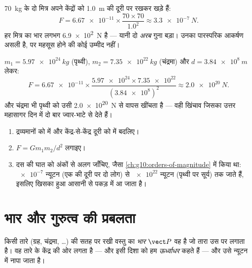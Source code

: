 \begin{example}[दो मित्र]\label{ex:g10:universal-gravitation:friends}
\qty{70}{kg} के दो मित्र अपने केंद्रों को \qty{1.0}{m} की दूरी पर रखकर खड़े हैं:
\[
F = \num{6.67e-11} \times \frac{70 \times 70}{1.0^2}
\approx \qty{3.3e-7}{N}.
\]
हर मित्र का भार लगभग \qty{6.9e2}{N} है --- यानी दो \emph{अरब} गुना
बड़ा। उनका पारस्परिक आकर्षण असली है, पर महसूस होने की कोई उम्मीद नहीं।
\end{example}

\begin{example}[पृथ्वी चंद्रमा को थामे है]\label{ex:g10:universal-gravitation:earthmoon}
$m_1 = \qty{5.97e24}{kg}$ (पृथ्वी), $m_2 = \qty{7.35e22}{kg}$ (चंद्रमा) और $d = \qty{3.84e8}{m}$ लेकर:
\[
F = \num{6.67e-11} \times
\frac{\num{5.97e24} \times \num{7.35e22}}{(\num{3.84e8})^2}
\approx \qty{2.0e20}{N}.
\]
और चंद्रमा भी पृथ्वी को उसी \qty{2.0e20}{N} से वापस खींचता है --- वही खिंचाव
जिसका उत्तर महासागर दिन में दो बार ज्वार-भाटे से देते हैं।
\end{example}

\begin{method}[कोई गुरुत्वाकर्षण बल निकालना]\label{met:g10:universal-gravitation:compute}
\begin{enumerate}
  \item द्रव्यमानों को  में और केंद्र-से-केंद्र दूरी को
         में बदलिए।
  \item $F = G m_1 m_2 / d^2$ लगाइए।
  \item दस की घात को अंकों से अलग जाँचिए, जैसा \cref{ch:g10:orders-of-magnitude} में किया था:
         $\num{e-7}$ न्यूटन (एक  की दूरी
        पर दो लोग) से $\num{e22}$ न्यूटन (पृथ्वी पर सूर्य) तक जाते हैं,
        इसलिए खिसका हुआ  आसानी से पकड़ में आ जाता है।
\end{enumerate}
\end{method}

\section{भार और गुरुत्व की प्रबलता}

\begin{definition}[भार]\label{def:g10:universal-gravitation:weight}
किसी तारे (ग्रह, चंद्रमा, \dots) की सतह पर रखी वस्तु का
\emph{भार} $\vect P$ वह  है जो तारा उस
पर लगाता है। वह तारे के केंद्र की ओर लगता है --- और इसी दिशा को हम
\emph{ऊर्ध्वाधर} कहते हैं --- और उसे न्यूटन में नापा
जाता है।
\end{definition}

